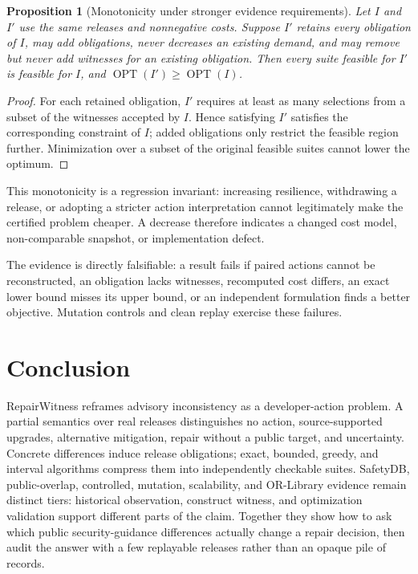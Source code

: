 \documentclass[10pt,conference]{IEEEtran}
\newtheorem{proposition}{Proposition}
\begin{document}
\begin{proposition}[Monotonicity under stronger evidence requirements]
Let $I$ and $I'$ use the same releases and nonnegative costs. Suppose $I'$ retains every obligation of $I$, may add obligations, never decreases an existing demand, and may remove but never add witnesses for an existing obligation. Then every suite feasible for $I'$ is feasible for $I$, and $\operatorname{OPT}(I')\geq\operatorname{OPT}(I)$.
\end{proposition}
\begin{proof}
For each retained obligation, $I'$ requires at least as many selections from a subset of the witnesses accepted by $I$. Hence satisfying $I'$ satisfies the corresponding constraint of $I$; added obligations only restrict the feasible region further. Minimization over a subset of the original feasible suites cannot lower the optimum.
\end{proof}

This monotonicity is a regression invariant: increasing resilience, withdrawing a release, or adopting a stricter action interpretation cannot legitimately make the certified problem cheaper. A decrease therefore indicates a changed cost model, non-comparable snapshot, or implementation defect.

The evidence is directly falsifiable: a result fails if paired actions cannot be reconstructed, an obligation lacks witnesses, recomputed cost differs, an exact lower bound misses its upper bound, or an independent formulation finds a better objective. Mutation controls and clean replay exercise these failures.

\section{Conclusion}
RepairWitness reframes advisory inconsistency as a developer-action problem. A partial semantics over real releases distinguishes no action, source-supported upgrades, alternative mitigation, repair without a public target, and uncertainty. Concrete differences induce release obligations; exact, bounded, greedy, and interval algorithms compress them into independently checkable suites. SafetyDB, public-overlap, controlled, mutation, scalability, and OR-Library evidence remain distinct tiers: historical observation, construct witness, and optimization validation support different parts of the claim. Together they show how to ask which public security-guidance differences actually change a repair decision, then audit the answer with a few replayable releases rather than an opaque pile of records.
\end{document}
